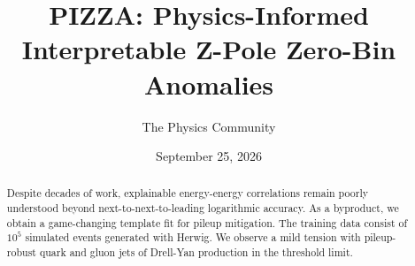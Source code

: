 \documentclass[11pt]{article}
\title{PIZZA: Physics-Informed Interpretable Z-Pole Zero-Bin Anomalies}
\author{The Physics Community}
\date{September 25, 2026}
\begin{document}
\maketitle
\begin{abstract}
Despite decades of work, explainable energy-energy correlations remain
poorly understood beyond next-to-next-to-leading logarithmic accuracy.
As a byproduct, we obtain a game-changing template fit for pileup
mitigation. The training data consist of $10^5$ simulated events
generated with Herwig. We observe a mild tension with pileup-robust
quark and gluon jets of Drell-Yan production in the threshold limit.
\end{abstract}
\tableofcontents





\nocite{*}


\end{document}
